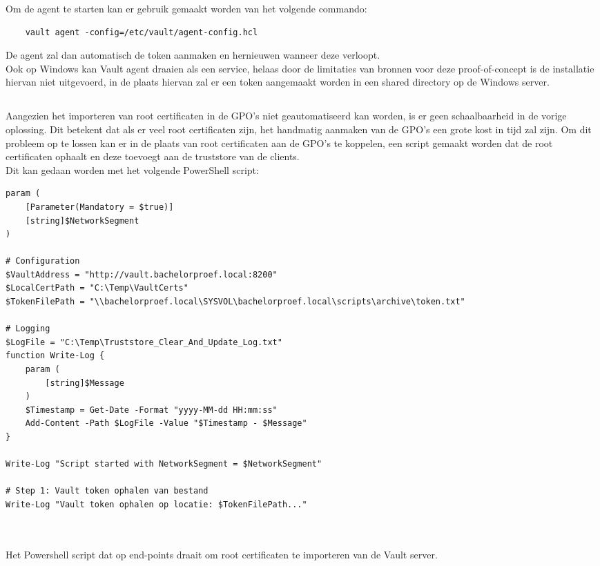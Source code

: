 \pagebreak

Om de agent te starten kan er gebruik gemaakt worden van het volgende commando:
\begin{verbatim}
    vault agent -config=/etc/vault/agent-config.hcl
\end{verbatim}

De agent zal dan automatisch de token aanmaken en hernieuwen wanneer deze verloopt. \\

Ook op Windows kan Vault agent draaien als een service, helaas door de limitaties van bronnen voor deze proof-of-concept is de installatie hiervan niet uitgevoerd, in de plaats hiervan zal er een token aangemaakt worden in een shared directory op de Windows server.

\pagebreak

\subsection{}
\label{subsec:Oplossing_voor_Windows_end-points_met_SCCM_en_Vault}

Aangezien het importeren van root certificaten in de GPO's niet geautomatiseerd kan worden, is er geen schaalbaarheid in de vorige oplossing. Dit betekent dat als er veel root certificaten zijn, het handmatig aanmaken van de GPO's een grote kost in tijd zal zijn.
Om dit probleem op te lossen kan er in de plaats van root certificaten aan de GPO's te koppelen, een script gemaakt worden dat de root certificaten ophaalt en deze toevoegt aan de truststore van de clients. \\

Dit kan gedaan worden met het volgende PowerShell script:

\begin{listing}[H]
\begin{verbatim}
param (
    [Parameter(Mandatory = $true)]
    [string]$NetworkSegment
)

# Configuration
$VaultAddress = "http://vault.bachelorproef.local:8200"
$LocalCertPath = "C:\Temp\VaultCerts"
$TokenFilePath = "\\bachelorproef.local\SYSVOL\bachelorproef.local\scripts\archive\token.txt"

# Logging
$LogFile = "C:\Temp\Truststore_Clear_And_Update_Log.txt"
function Write-Log {
    param (
        [string]$Message
    )
    $Timestamp = Get-Date -Format "yyyy-MM-dd HH:mm:ss"
    Add-Content -Path $LogFile -Value "$Timestamp - $Message"
}

Write-Log "Script started with NetworkSegment = $NetworkSegment"

# Step 1: Vault token ophalen van bestand
Write-Log "Vault token ophalen op locatie: $TokenFilePath..."



\end{verbatim}
\caption[Powershell script om root certificaten te importeren van de Vault]{Het Powershell script dat op end-points draait om root certificaten te importeren van de Vault server.}
\end{listing}

